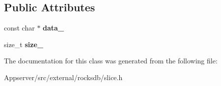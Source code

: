 \subsection*{Public Attributes}
\begin{DoxyCompactItemize}
\item 
const char $\ast$ {\bfseries data\+\_\+}\hypertarget{classrocksdb_1_1Slice_a3592506f631a3e0f6e8fe6c12a400df4}{}\label{classrocksdb_1_1Slice_a3592506f631a3e0f6e8fe6c12a400df4}

\item 
size\+\_\+t {\bfseries size\+\_\+}\hypertarget{classrocksdb_1_1Slice_a558ae353ac43637ac75a97dd5fb542f0}{}\label{classrocksdb_1_1Slice_a558ae353ac43637ac75a97dd5fb542f0}

\end{DoxyCompactItemize}


The documentation for this class was generated from the following file\+:\begin{DoxyCompactItemize}
\item 
Appserver/src/external/rocksdb/slice.\+h\end{DoxyCompactItemize}

